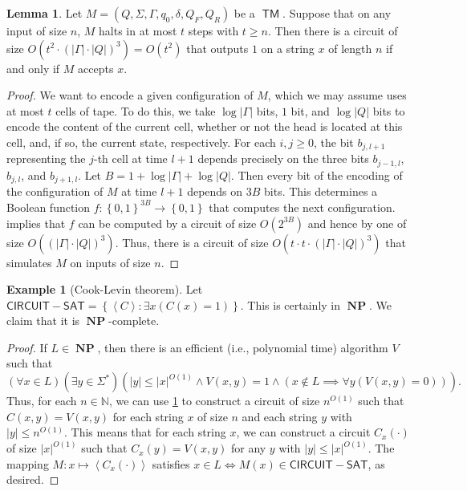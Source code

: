 \documentclass[10pt,letterpaper,cm]{nupset}
\theoremstyle{definition}
\newtheorem{exmp}[definition]{Example}
\theoremstyle{theorem}
\newtheorem{lemma}[definition]{Lemma}
\theoremstyle{remark}
\newcommand{\N}{\mathbb N}
\newcommand{\1}{\mathbf{1}}
\newcommand{\0}{\vec 0}
\DeclareMathOperator{\TM}{\mathsf{TM}}
\DeclareMathOperator{\NP}{\mathbf{NP}}
\begin{document}
\begin{lemma}\label{pl2}
Let $M= \left(Q, \Sigma, \Gamma, q_0, \delta, Q_F, Q_R\right)$ be a $\TM$. Suppose that on any input of size $n$, $M$ halts in at most $t$ steps with $t\geq n$. Then there is a circuit of size $O(t^2 \cdot (\left\lvert{\Gamma}\right\rvert\cdot \left\lvert{Q}\right\rvert)^3) = O(t^2)$ that  outputs $1$ on a  string $x$ of length $n$ if and only if $M$ accepts $x$.
\end{lemma}
\begin{proof}
We want to encode a given configuration of $M$, which we may assume uses at most $t$ cells of tape. To do this, we take $\log{\left\lvert{\Gamma}\right\rvert}$ bits, $1$ bit, and $\log{\left\lvert{Q}\right\rvert}$ bits to encode the content of the current cell, whether or not the head is located at this cell, and, if so, the current state, respectively.  For each $i,j\geq0$, the bit $b_{j, l+1}$ representing the $j$-th cell at time $l+1$ depends precisely on the three bits $b_{j-1, l}$, $b_{j, l}$, and $b_{j+1, l}$. Let $B= 1+ \log{\left\lvert{\Gamma}\right\rvert} +\log{\left\lvert{Q}\right\rvert}$. Then every bit of the encoding of the configuration of $M$ at time $l+1$ depends on $3B$ bits. This determines a Boolean function $f: \left\{0,1\right\}^{3B}\to \left\{0,1\right\}$ that computes the next configuration.  implies that $f$ can be computed by a circuit of size $O(2^{3B})$ and hence by one of size $O(\left(\left\lvert{\Gamma}\right\rvert\cdot \left\lvert{Q}\right\rvert\right)^3)$. Thus, there is a circuit of size $O(t\cdot t\cdot  \left(\left\lvert{\Gamma}\right\rvert \cdot \left\lvert{Q}\right\rvert\right)^3)$ that simulates $M$ on inputs of size $n$.
\end{proof}

\begin{exmp}[Cook-Levin theorem]
Let  $\mathsf{CIRCUIT{-}SAT} = \left\{ \left\langle C \right\rangle : \exists x\left(C(x) = 1\right)\right\}$. This is certainly in $\NP$. We claim that it is $\NP$-complete.
\end{exmp}
\begin{proof}
If $L \in \NP$, then there is an efficient (i.e.,  polynomial time) algorithm $V$ such that $$\left(\forall x\in L\right)\left(\exists y\in \Sigma^{\ast}\right)\left(\left\lvert{y}\right\rvert\leq \left\lvert{x}\right\rvert^{O(1)} \land V\left(x,y\right) =1 \land \left(x\notin L \implies \forall y\left(V\left(x,y\right)=0\right)\right)\right).$$ Thus, for each $n\in \N$, we can use \cref{pl2} to construct a circuit of size $n^{O(1)}$ such that $C\left(x,y\right) = V\left(x,y\right)$ for each string $x$ of size $n$ and each string $y$ with $\left\lvert{y}\right\rvert\leq n^{O(1)}$. This means that for each string $x$, we can construct a circuit $C_x({\cdot})$ of size $\left\lvert{x}\right\rvert^{O(1)}$ such that $C_x(y) = V\left(x,y\right)$ for any $y$ with $\left\lvert{y}\right\rvert\leq \left\lvert{x}\right\rvert^{O(1)}$. The mapping $M: x\mapsto \left\langle C_x({\cdot}) \right\rangle$ satisfies $x\in L \iff M(x) \in \mathsf{CIRCUIT{-}SAT}$, as desired.  
\end{proof}
\end{document}
